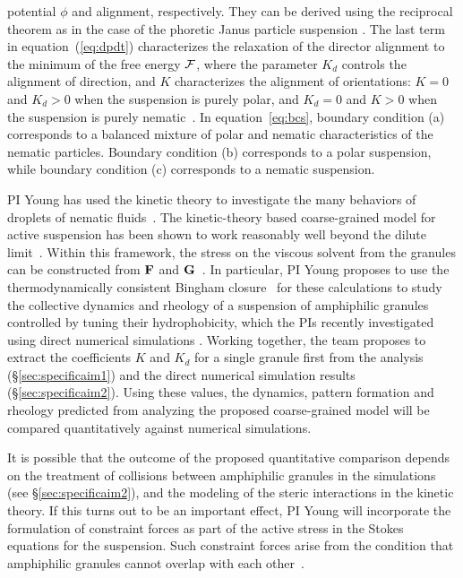 potential $\phi$ and alignment, respectively. They can be derived using
the reciprocal theorem as in the case of the phoretic Janus particle
suspension \cite{TraversoMichellin2020_PRF,TraversoMichellin2022_JFM}.
The last term in equation~(\ref{eq:dpdt}) characterizes the relaxation
of the director alignment to the minimum of the free energy ${\cal F}$,
where the parameter $K_d$ controls the alignment of direction, and $K$
characterizes the alignment of orientations: $K=0$ and $K_d > 0$ when
the suspension is purely polar, and $K_d=0$ and $K>0$ when the
suspension is purely nematic~\cite{Amiri2022_JPhysA}. 
%
In equation~\eqref{eq:bcs}, boundary condition (a) corresponds to a
balanced mixture of polar and nematic characteristics of the nematic
particles. Boundary condition (b) corresponds to a polar suspension,
while boundary condition (c) corresponds to a nematic suspension. 

PI Young has used the kinetic theory to investigate the many behaviors
of droplets of nematic fluids~\cite{YoungShelleyStein2021_MBE}. The
kinetic-theory based coarse-grained model for active suspension has been
shown to work reasonably well beyond the dilute
limit~\cite{Saintillan2018_ARFM}. Within this framework, the stress on
the viscous solvent from the granules can be constructed from ${\bf F}$
and ${\bf G}$~\cite{TraversoMichellin2020_PRF,
TraversoMichellin2022_JFM}. In particular, PI Young proposes to use the
thermodynamically consistent Bingham
closure~\cite{YoungShelleyStein2021_MBE} for these calculations to study
the collective dynamics and rheology of a suspension of amphiphilic granules
controlled by tuning their hydrophobicity, which the PIs recently investigated using direct
numerical simulations \cite{fu-ryh-qua-you2022}. 
Working together, the team proposes to extract the coefficients $K$ and $K_d$ for a
single granule first from the analysis (\S\ref{sec:specificaim1}) and
the direct numerical simulation results (\S\ref{sec:specificaim2}).
Using these values, the dynamics, pattern formation and rheology
predicted from analyzing the proposed coarse-grained model will be
compared quantitatively against numerical simulations. 

It is possible that the outcome of the proposed quantitative comparison
depends on the treatment of collisions between amphiphilic granules in
the simulations (see \S\ref{sec:specificaim2}), and the modeling of the
steric interactions in the kinetic theory. If this turns out to be an
important effect, PI Young will incorporate the formulation of
constraint forces as part of the active stress in the Stokes equations
for the suspension. Such constraint forces arise from the condition that amphiphilic granules cannot overlap with each
other~\cite{Weady2022_PRF}. 

